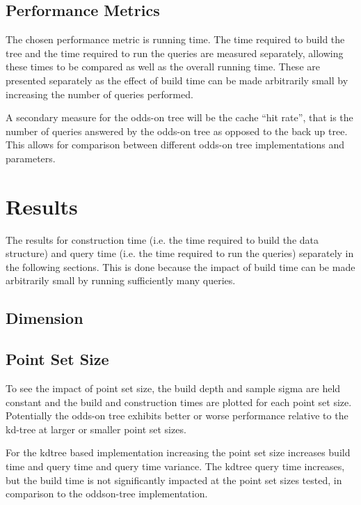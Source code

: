 \documentclass[mcs]{scsthesis}
\begin{document}
\subsection{Performance Metrics}

The chosen performance metric is running time. The time required to build the
tree and the time required to run the queries are measured separately, allowing
these times to be compared as well as the overall running time. These are
presented separately as the effect of build time can be made arbitrarily small
by increasing the number of queries performed.

A secondary measure for the odds-on tree will be the cache ``hit rate'', that
is the number of queries answered by the odds-on tree as opposed to the back
up tree. This allows for comparison between different odds-on tree
implementations and parameters. 

\section{Results}

The results for construction time (i.e. the time required to build the data
structure) and query time (i.e. the time required to run the queries)
separately in the following sections. This is done because the impact of
build time can be made arbitrarily small by running sufficiently many queries.

\subsection{Dimension}

\subsection{Point Set Size}

To see the impact of point set size, the build depth and sample sigma are held
constant and the build and construction times are plotted for each point set
size. Potentially the odds-on tree exhibits better or worse performance relative
to the kd-tree at larger or smaller point set sizes.

For the kdtree based implementation increasing the point set size increases
build time and query time and query time variance. The kdtree query time
increases, but the build time is not significantly impacted at the point set
sizes tested, in comparison to the oddson-tree implementation.
\end{document}
